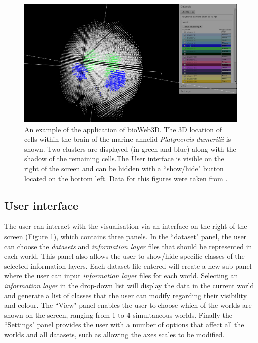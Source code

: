 \documentclass{bioinfo}
\begin{document}
\begin{figure}[h!]%
\centerline{\includegraphics[totalheight=0.2\textheight]{fig1.png}}
\caption{An example of the application of bioWeb3D. The 3D location of cells within the brain of the marine annelid {\it{Platynereis dumerilii}} is shown. Two clusters are displayed (in green and blue) along with the shadow of the remaining cells.The User interface is visible on the right of the screen and can be hidden with a ``show/hide" button located on the bottom left. Data for this figures were taken from \citep{Tomer10}.}\label{fig:01}
\end{figure}

\subsection{User interface}
The user can interact with the visualisation via an interface on the right of the screen (Figure 1), which contains three panels. In the ``dataset" panel, the user can choose the {\it{datasets}} and {\it{information layer}} files that should be represented in each world. This panel also allows the user to show/hide specific classes of the selected information layers. Each dataset file entered will create a new sub-panel where the user can input {\it{information layer}} files for each world. Selecting an {\it{information layer}} in the drop-down list will display the data in the current world and generate a list of classes that the user can modify regarding their visibility and colour. The ``View" panel enables the user to choose which of the worlds are shown on the screen, ranging from 1 to 4 simultaneous worlds. Finally the ``Settings" panel provides the user with a number of options that affect all the worlds and all datasets, such as allowing the axes scales to be modified.
\end{document}
